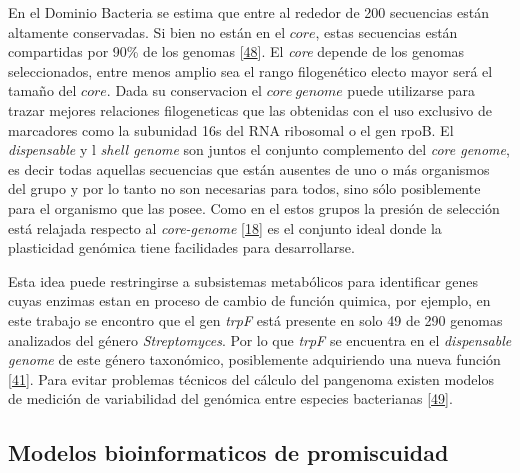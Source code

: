 \documentclass[12pt,twoside]{reedthesis}
\begin{document}
  En el Dominio Bacteria se estima que entre al rededor de 200 secuencias
  están altamente conservadas. Si bien no están en el \(core\), estas
  secuencias están compartidas por 90\% de los genomas
  {[}\protect\hyperlink{ref-halachev_calculating_2011}{48}{]}. El
  \emph{core} depende de los genomas seleccionados, entre menos amplio sea
  el rango filogenético electo mayor será el tamaño del \(core\). Dada su
  conservacion el \(core~genome\) puede utilizarse para trazar mejores
  relaciones filogeneticas que las obtenidas con el uso exclusivo de
  marcadores como la subunidad 16s del RNA ribosomal o el gen rpoB. El
  \emph{dispensable} y l \emph{shell genome} son juntos el conjunto
  complemento del \emph{core genome}, es decir todas aquellas secuencias
  que están ausentes de uno o más organismos del grupo y por lo tanto no
  son necesarias para todos, sino sólo posiblemente para el organismo que
  las posee. Como en el estos grupos la presión de selección está relajada
  respecto al \emph{core-genome}
  {[}\protect\hyperlink{ref-firn_darwinian_2009}{18}{]} es el conjunto
  ideal donde la plasticidad genómica tiene facilidades para
  desarrollarse.
  
  Esta idea puede restringirse a subsistemas metabólicos para identificar
  genes cuyas enzimas estan en proceso de cambio de función quimica, por
  ejemplo, en este trabajo se encontro que el gen \emph{trpF} está
  presente en solo 49 de 290 genomas analizados del género
  \emph{Streptomyces}. Por lo que \emph{trpF} se encuentra en el
  \emph{dispensable genome} de este género taxonómico, posiblemente
  adquiriendo una nueva función
  {[}\protect\hyperlink{ref-ma_unconventional_2013}{41}{]}. Para evitar
  problemas técnicos del cálculo del pangenoma existen modelos de medición
  de variabilidad del genómica entre especies bacterianas
  {[}\protect\hyperlink{ref-kislyuk_genomic_2011}{49}{]}.
  
  \subsection{Modelos bioinformaticos de
  promiscuidad}\label{modelos-bioinformaticos-de-promiscuidad}
  
\end{document}

